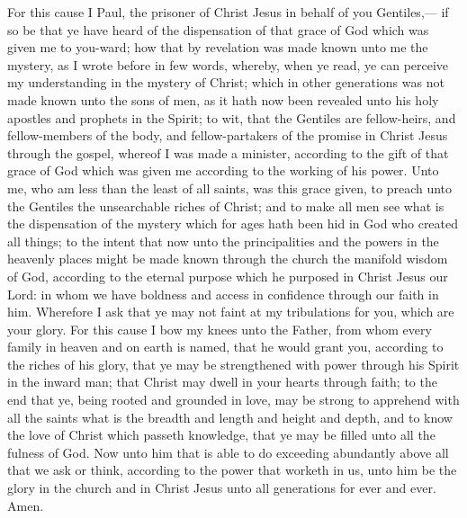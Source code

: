 For this cause I Paul, the prisoner of Christ Jesus in behalf of you Gentiles,— if so be that ye have heard of the dispensation of that grace of God which was given me to you-ward; how that by revelation was made known unto me the mystery, as I wrote before in few words, whereby, when ye read, ye can perceive my understanding in the mystery of Christ; which in other generations was not made known unto the sons of men, as it hath now been revealed unto his holy apostles and prophets in the Spirit; to wit, that the Gentiles are fellow-heirs, and fellow-members of the body, and fellow-partakers of the promise in Christ Jesus through the gospel, whereof I was made a minister, according to the gift of that grace of God which was given me according to the working of his power. Unto me, who am less than the least of all saints, was this grace given, to preach unto the Gentiles the unsearchable riches of Christ; and to make all men see what is the dispensation of the mystery which for ages hath been hid in God who created all things; to the intent that now unto the principalities and the powers in the heavenly places might be made known through the church the manifold wisdom of God, according to the eternal purpose which he purposed in Christ Jesus our Lord: in whom we have boldness and access in confidence through our faith in him. Wherefore I ask that ye may not faint at my tribulations for you, which are your glory.  For this cause I bow my knees unto the Father, from whom every family in heaven and on earth is named, that he would grant you, according to the riches of his glory, that ye may be strengthened with power through his Spirit in the inward man; that Christ may dwell in your hearts through faith; to the end that ye, being rooted and grounded in love, may be strong to apprehend with all the saints what is the breadth and length and height and depth, and to know the love of Christ which passeth knowledge, that ye may be filled unto all the fulness of God.  Now unto him that is able to do exceeding abundantly above all that we ask or think, according to the power that worketh in us, unto him be the glory in the church and in Christ Jesus unto all generations for ever and ever. Amen. 


